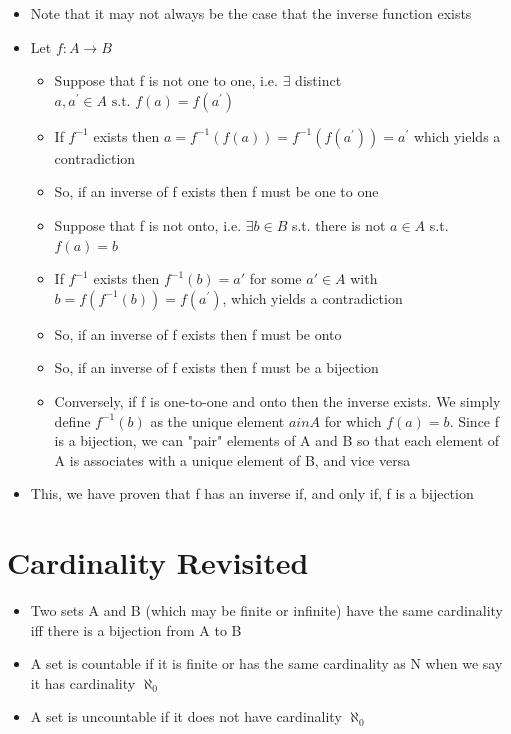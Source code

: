 \documentclass{article}[18pt]
\begin{document}
\begin{itemize}
	\item Note that it may not always be the case that the inverse function exists
	\item Let $f: A\rightarrow B$
	\begin{itemize}
		\item Suppose that f is not one to one, i.e. $\exists$ distinct $a , a ^ { \prime } \in A \text { s.t. } f ( a ) = f \left( a ^ { \prime } \right)$
		\item If $f^{-1}$ exists then $a = f ^ { - 1 } ( f ( a ) ) = f ^ { - 1 } \left( f \left( a ^ { \prime } \right) \right) = a ^ { \prime }$ which yields a contradiction
		\item So, if an inverse of f exists then f must be one to one
		\item Suppose that f is not onto, i.e. $\exists b\in B$ s.t. there is not $a\in A$ s.t. $f(a)=b$
		\item If $f^{-1}$ exists then $f^{-1}(b)=a'$ for some $a'\in A$ with $b = f \left( f ^ { - 1 } ( b ) \right) = f \left( a ^ { \prime } \right)$, which yields a contradiction
		\item So, if an inverse of f exists then f must be onto
		\item So, if an inverse of f exists then f must be a bijection
		\item Conversely, if f is one-to-one and onto then the inverse exists. We simply define $f^{-1}(b)$ as the unique element $ain A$ for which $f(a)=b$. Since f is a bijection, we can "pair" elements of A and B so that each element of A is associates with a unique element of B, and vice versa
	\end{itemize}
	\item This, we have proven that f has an inverse if, and only if, f is a bijection
\end{itemize}
\section{Cardinality Revisited}
\begin{itemize}
	\item Two sets A and B (which may be finite or infinite) have the same cardinality iff there is a bijection from A to B
	\item A set is countable if it is finite or has the same cardinality as N when we say it has cardinality $\aleph_0$
	\item A set is uncountable if it does not have cardinality $\aleph_0$
\end{itemize}
\end{document}
